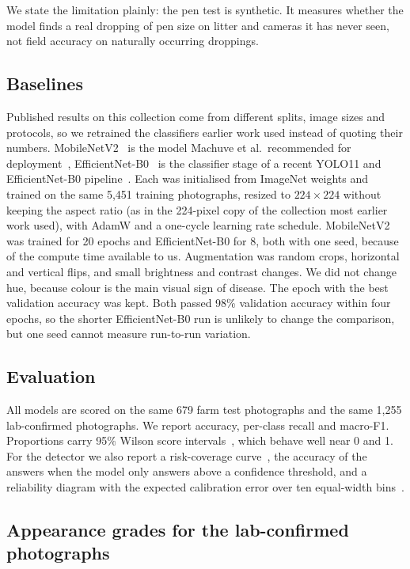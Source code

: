 \documentclass[10pt,twocolumn]{article}
\begin{document}
We state the limitation plainly: the pen test is synthetic. It measures whether the model finds a real dropping of
pen size on litter and cameras it has never seen, not field accuracy on naturally occurring droppings.

\subsection{Baselines}
\label{sec:bench}

Published results on this collection come from different splits, image sizes and protocols, so we retrained the
classifiers earlier work used instead of quoting their numbers. MobileNetV2~\cite{sandler2018} is the model
Machuve et al.\ recommended for deployment~\cite{machuve2022}, EfficientNet-B0~\cite{tan2019} is the
classifier stage of a recent YOLO11 and EfficientNet-B0 pipeline~\cite{dhungana2025}. Each was
initialised from ImageNet weights and trained on the same 5,451 training photographs, resized to $224\times224$
without keeping the aspect ratio (as in the 224-pixel copy of the collection most earlier work used), with AdamW and a
one-cycle learning rate schedule. MobileNetV2 was trained for 20 epochs and EfficientNet-B0 for 8, both with one seed,
because of the compute time available to us. Augmentation
was random crops, horizontal and vertical flips, and small brightness and contrast changes. We did not change hue,
because colour is the main visual sign of disease. The epoch with the best validation accuracy was kept. Both passed 98\% validation accuracy within four epochs, so the shorter EfficientNet-B0 run is unlikely to change
the comparison, but one seed cannot measure run-to-run variation.

\subsection{Evaluation}
\label{sec:eval}

All models are scored on the same 679 farm test photographs and the same 1,255 lab-confirmed photographs. We report
accuracy, per-class recall and macro-F1. Proportions carry 95\% Wilson score intervals~\cite{wilson1927}, which
behave well near 0 and 1. For the detector we also report a risk-coverage curve~\cite{geifman2017}, the
accuracy of the answers when the model only answers above a confidence threshold, and a reliability diagram with the
expected calibration error over ten equal-width bins~\cite{guo2017}.

\subsection{Appearance grades for the lab-confirmed photographs}
\label{sec:grades}
\end{document}
